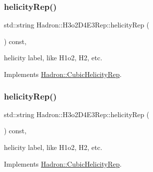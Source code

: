 \mbox{\label{structHadron_1_1H3o2D4E3Rep_a12aad531820b348259dc0dfa8c0a259f}} 
\subsubsection{\texorpdfstring{helicityRep()}{helicityRep()}\hspace{0.1cm}{\footnotesize\ttfamily [1/2]}}
{\footnotesize\ttfamily std\+::string Hadron\+::\+H3o2\+D4\+E3\+Rep\+::helicity\+Rep (\begin{DoxyParamCaption}{ }\end{DoxyParamCaption}) const\hspace{0.3cm}{\ttfamily [inline]}, {\ttfamily [virtual]}}

helicity label, like H1o2, H2, etc. 

Implements \mbox{\hyperlink{structHadron_1_1CubicHelicityRep_af1096946b7470edf0a55451cc662f231}{Hadron\+::\+Cubic\+Helicity\+Rep}}.

\mbox{\label{structHadron_1_1H3o2D4E3Rep_a12aad531820b348259dc0dfa8c0a259f}} 
\subsubsection{\texorpdfstring{helicityRep()}{helicityRep()}\hspace{0.1cm}{\footnotesize\ttfamily [2/2]}}
{\footnotesize\ttfamily std\+::string Hadron\+::\+H3o2\+D4\+E3\+Rep\+::helicity\+Rep (\begin{DoxyParamCaption}{ }\end{DoxyParamCaption}) const\hspace{0.3cm}{\ttfamily [inline]}, {\ttfamily [virtual]}}

helicity label, like H1o2, H2, etc. 

Implements \mbox{\hyperlink{structHadron_1_1CubicHelicityRep_af1096946b7470edf0a55451cc662f231}{Hadron\+::\+Cubic\+Helicity\+Rep}}.

\mbox{\label{structHadron_1_1H3o2D4E3Rep_ab7eff64255c6e04c36a08a7222b349ad}} 
